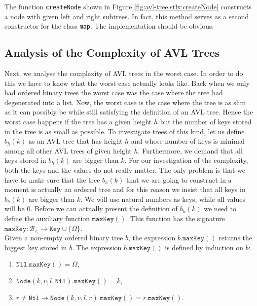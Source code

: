 The function \texttt{createNode} shown in Figure \ref{fig:avl-tree.stlx:createNode}
constructs a node with given left and right subtrees.  In fact, this method serves as a second
constructor for the class \texttt{map}.  The implementation should be obvious.


\subsection{Analysis of the Complexity of AVL Trees}
Next, we analyse the complexity of AVL trees in the worst case.  In order to do this we have to know
what the worst case actually looks like.  Back when we only had ordered binary trees the worst case was the case where
the tree had degenerated into a list.  Now, the worst case is the case where the tree is as slim as
it can possibly be while still satisfying the definition of an AVL tree.  Hence the worst case
happens if the tree has a given height $h$ but the number of keys stored in the tree is as small as
possible.  To investigate trees of this kind, let us define  $b_h(k)$ as an AVL tree that has height
$h$ and whose number of keys is minimal among all other AVL trees of given  height $h$.  Furthermore,
we demand that all keys stored in  $b_h(k)$ are bigger than  $k$.  For our investigation of the
complexity, both the keys and the values do not really matter.  The only problem is that we have to
make sure that the tree $b_h(k)$ that we are going to construct in a moment is actually an ordered
tree and for this reason we insist that all keys in $b_h(k)$ are bigger than $k$.  We will use
natural numbers as keys, while all values will be $0$.
Before we can actually present the definition of  $b_h(k)$ we need to define the auxiliary function
 $\mathtt{maxKey}()$.  This function has the signature 
\\[0.2cm]
\hspace*{1.3cm}
$\mathtt{maxKey}:\mathcal{B}_< \rightarrow \mathtt{Key} \cup \{ \Omega \}$.
\\[0.2cm]
Given a non-empty ordered binary tree  $b$, the expression $b.\mathtt{maxKey}()$ returns the biggest
key stored in $b$.  The expression  $b.\mathtt{maxKey}()$ is defined by induction on $b$:
\begin{enumerate}
\item $\mathtt{Nil}.\mathtt{maxKey}() = \Omega$,
\item $\mathtt{Node}(k,v,l,\mathtt{Nil}).\mathtt{maxKey}() = k$,
\item $r \not= \mathtt{Nil} \rightarrow \mathtt{Node}(k,v,l,r).\mathtt{maxKey}() = r.\mathtt{maxKey}()$.
\end{enumerate}
